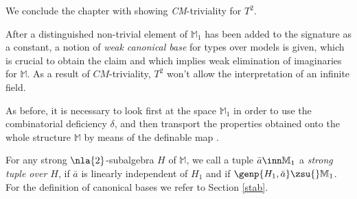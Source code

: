 We conclude the chapter with showing {\sl CM}-triviality for $T^{2}$.

After
a distinguished non-trivial element of $\mathbb{M}_{1}$ has been added to the signature as a constant, a notion of {\em weak canonical
base} for types over models is given,
which is crucial to obtain the claim and which implies weak elimination of imaginaries for $\mathbb{M}$.
As a result of $CM$-triviality, $T^{2}$ won't allow the interpretation of an infinite field.

As before, it is necessary to look first at the space $\mathbb{M}_{1}$
in order to use the combinatorial deficiency $\delta$, and then transport the properties obtained onto the whole structure
$\mathbb{M}$ by means of the definable map .

\medskip
For any strong $\nla{2}$-subalgebra $H$ of $\mathbb{M}$, we call a tuple $\bar a\inn\mathbb{M}_{1}$ a {\em strong tuple over $H$},
if $\bar a$ is linearly independent of $H_{1}$ and if $\genp{H_{1},\bar a}\zsu{}\mathbb{M}_{1}$. For the
definition of canonical bases we refer to Section \ref{stab}.

